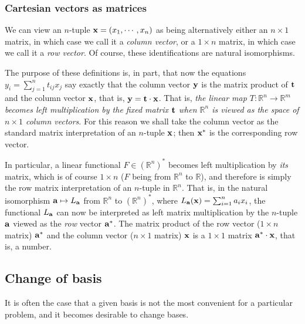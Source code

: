 \documentclass[12pt,letterpaper,reqno]{article}
\numberwithin{equation}{section}
\newcommand{\ti}[1]{\textit{#1}}
\begin{document}
\subsubsection{Cartesian vectors as matrices}
We can view an $n$-tuple ${\bf x}=(x_1,\cdots,x_n)$ as being alternatively either an $n\times 1$ matrix, in which case we call it a \ti{column vector}, or a $1 \times n$ matrix, in which case we call it a \ti{row vector}. Of course, these identifications are natural isomorphisms. 

The purpose of these definitions is, in part, that now the equations $y_i=\sum_{j=1}^n t_{ij} x_j$ say exactly that the column vector ${\bf y}$ is the matrix product of ${\bf t}$ and the column vector ${\bf x}$, that is, ${\bf y}={\bf t} \cdot {\bf x}$. That is, \ti{the linear map $T:\mathbb{R}^n \to \mathbb{R}^m$ becomes left multiplication by the fixed matrix ${\bf t}$ when $\mathbb{R}^n$ is viewed as the space of $n \times 1$ column vectors}. For this reason we shall take the column vector as the standard matrix interpretation of an $n$-tuple ${\bf x}$; then ${\bf x}^*$ is the corresponding row vector.

In particular, a linear functional $F \in (\mathbb{R}^n)^*$ becomes left multiplication by \ti{its} matrix, which is of course $1 \times n$ ($F$ being from $\mathbb{R}^n$ to $\mathbb{R}$), and therefore is simply the row matrix interpretation of an $n$-tuple in $\mathbb{R}^n$. That is, in the natural isomorphism ${\bf a} \mapsto L_{\bf a}$ from $\mathbb{R}^n$ to $(\mathbb{R}^n)^*$, where $L_{\bf a}({\bf x})=\sum_{i=1}^na_ix_i$, the functional $L_{\bf a}$ can now be interpreted as left matrix multiplication by the $n$-tuple ${\bf a}$ viewed as the \ti{row} vector ${\bf a}^*$. The matrix product of the row vector ($1 \times n$ matrix) ${\bf a}^*$ and the column vector ($n \times 1$ matrix) ${\bf x}$ is a $1 \times 1$ matrix ${\bf a}^* \cdot {\bf x}$, that is, a number.












\subsection{Change of basis}
It is often the case that a given basis is not the most convenient for a particular problem, and it becomes desirable to change bases.
\end{document}
